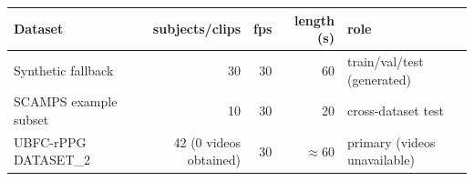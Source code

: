 \begin{tabular}{lrrrl}\toprule
Dataset & subjects/clips & fps & length (s) & role \\\midrule
Synthetic fallback & 30 & 30 & 60 & train/val/test (generated) \\
SCAMPS example subset & 10 & 30 & 20 & cross-dataset test \\
UBFC-rPPG DATASET\_2 & 42 (0 videos obtained) & 30 & $\approx$60 & primary (videos unavailable) \\
\bottomrule\end{tabular}
